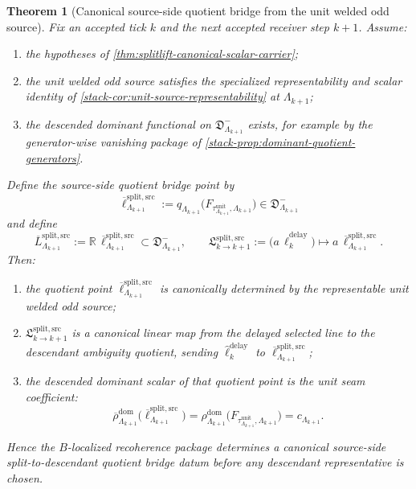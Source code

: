 \documentclass[11pt]{article}
\theoremstyle{definition}
\theoremstyle{plain}
\newtheorem{theorem}[definition]{Theorem}
\theoremstyle{remark}
\newcommand{\1}{\mathbf 1}
\begin{document}
\begin{theorem}[Canonical source-side quotient bridge from the unit welded odd source]
\label{thm:splitlift-canonical-quotient-bridge}
Fix an accepted tick \(k\) and the next accepted receiver step \(k+1\).
Assume:
\begin{enumerate}[leftmargin=2em]
\item the hypotheses of \cref{thm:splitlift-canonical-scalar-carrier};
\item the unit welded odd source satisfies the specialized representability and scalar identity of
  \cref{stack-cor:unit-source-representability} at \(\Lambda_{k+1}\);
\item the descended dominant functional on
  \(
  \mathfrak D^-_{\Lambda_{k+1}}
  \)
  exists, for example by the generator-wise vanishing package of
  \cref{stack-prop:dominant-quotient-generators}.
\end{enumerate}
Define the source-side quotient bridge point by
\[
\overline\ell^{\mathrm{split,src}}_{\Lambda_{k+1}}
:=
q_{\Lambda_{k+1}}
\!\bigl(
F_{\tau^{\mathrm{unit}}_{\Lambda_{k+1}},\Lambda_{k+1}}
\bigr)
\in
\mathfrak D^-_{\Lambda_{k+1}}
\]
and define
\[
\overline L^{\mathrm{split,src}}_{\Lambda_{k+1}}
:=
\mathbb R\,\overline\ell^{\mathrm{split,src}}_{\Lambda_{k+1}}
\subset
\mathfrak D^-_{\Lambda_{k+1}},
\qquad
\mathfrak L^{\mathrm{split,src}}_{k\to k+1}
:=
\bigl(
a\,\widehat\ell^{\mathrm{delay}}_k
\bigr)
\longmapsto
a\,\overline\ell^{\mathrm{split,src}}_{\Lambda_{k+1}}.
\]
Then:
\begin{enumerate}[leftmargin=2em]
\item the quotient point
  \(
  \overline\ell^{\mathrm{split,src}}_{\Lambda_{k+1}}
  \)
  is canonically determined by the representable unit welded odd source;
\item
  \(
  \mathfrak L^{\mathrm{split,src}}_{k\to k+1}
  \)
  is a canonical linear map from the delayed selected line to the descendant ambiguity quotient,
  sending
  \(
  \widehat\ell^{\mathrm{delay}}_k
  \)
  to
  \(
  \overline\ell^{\mathrm{split,src}}_{\Lambda_{k+1}}
  \);
\item the descended dominant scalar of that quotient point is the unit seam coefficient:
  \[
  \overline{\rho}^{\mathrm{dom}}_{\Lambda_{k+1}}
  \bigl(
  \overline\ell^{\mathrm{split,src}}_{\Lambda_{k+1}}
  \bigr)
  =
  \rho^{\mathrm{dom}}_{\Lambda_{k+1}}
  \!\bigl(
  F_{\tau^{\mathrm{unit}}_{\Lambda_{k+1}},\Lambda_{k+1}}
  \bigr)
  =
  c_{\Lambda_{k+1}}.
  \]
\end{enumerate}
Hence the \(B\)-localized recoherence package determines a canonical source-side split-to-descendant
quotient bridge datum before any descendant representative is chosen.
\end{theorem}
\end{document}
